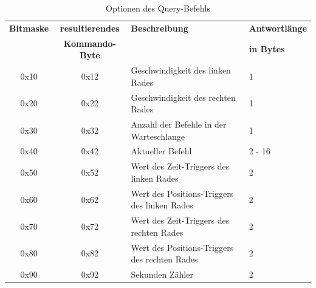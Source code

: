 \begin{table}[htb]
\begin{center}
	\begin{tabularx}{\linewidth}{|c|c|X|l|}
		\hline
		\textbf{Bitmaske} & \textbf{resultierendes} & \textbf{Beschreibung} & \textbf{Antwortlänge} \\
		                  & \textbf{Kommando-Byte}  &                       & \textbf{in Bytes}\\
		\hline
		\hline
		0x10              & 0x12                    & Geschwindigkeit des linken Rades & 1 \\
		\hline
		0x20              & 0x22                    & Geschwindigkeit des rechten Rades & 1 \\
		\hline
		0x30              & 0x32                    & Anzahl der Befehle in der Warteschlange & 1 \\
		\hline
		0x40              & 0x42                    & Aktueller Befehl & 2 - 16 \\
		\hline
		0x50              & 0x52                    & Wert des Zeit-Triggers des linken Rades & 2 \\
		\hline
		0x60              & 0x62                    & Wert des Positions-Triggers des linken Rades & 2 \\
		\hline
		0x70              & 0x72                    & Wert des Zeit-Triggers des rechten Rades & 2 \\
		\hline
		0x80              & 0x82                    & Wert des Positions-Triggers des rechten Rades & 2 \\
		\hline
		0x90              & 0x92                    & Sekunden Zähler & 2 \\
		\hline
	\end{tabularx}
	\caption{\label{protocol_queue} Optionen des Query-Befehls}
\end{center}
\end{table}

